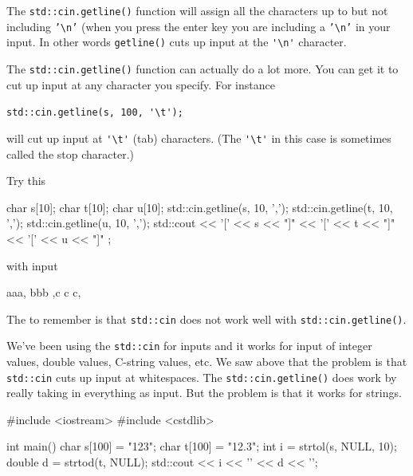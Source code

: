 The \texttt{std::cin.getline()} function will assign all the characters up to but not including \texttt{'\textbackslash n'} (when you press the enter key you are including a \texttt{'\textbackslash n'} in your input. In other words \verb!getline()! cuts up input at the \verb!'\n'! character.

The \texttt{std::cin.getline()} function can actually do a lot more. You can get it to cut up input at any character you specify. For instance

\begin{center}
\verb!std::cin.getline(s, 100, '\t');!
\end{center}

will cut up input at \verb!'\t'! (tab) characters. (The \verb!'\t'! in this case is sometimes called the stop character.)

Try this

\begin{consolethree}[escapeinside=||]
char s[10];
char t[10];
char u[10];
std::cin.getline(s, 10, ',');
std::cin.getline(t, 10, ',');
std::cin.getline(u, 10, ',');
std::cout << '[' << s << "]\n"
          << '[' << t << "]\n"
          << '[' << u << "]\n" ;
\end{consolethree}

with input

\begin{console}
aaa, bbb ,c c c,
\end{console}



\newpage{}

The  to remember is that \texttt{std::cin} does not work well with \texttt{std::cin.getline()}.


\newpage{}

We've been using the \texttt{std::cin} for inputs and it works for input of integer values, double values, C-string values, etc. We saw above that the problem is that \texttt{std::cin} cuts up input at whitespaces. The \texttt{std::cin.getline()} does work by really taking in everything as input. But the problem is that it works for strings.

\begin{consolethree}[escapeinside=||]
#include <iostream>
#include <cstdlib>

int main()
{
    char s[100] = "123";
    char t[100] = "12.3";
    int i = strtol(s, NULL, 10);
    double d = strtod(t, NULL);
    std::cout << i << '\n' << d << '\n';
}
\end{consolethree}

